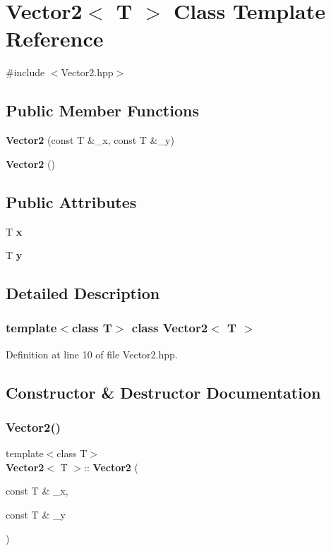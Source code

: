 \section{Vector2$<$ T $>$ Class Template Reference}
\label{class_vector2}


{\ttfamily \#include $<$Vector2.\+hpp$>$}

\subsection*{Public Member Functions}
\begin{DoxyCompactItemize}
\item 
\textbf{ Vector2} (const T \&\+\_\+x, const T \&\+\_\+y)
\item 
\textbf{ Vector2} ()
\end{DoxyCompactItemize}
\subsection*{Public Attributes}
\begin{DoxyCompactItemize}
\item 
T \textbf{ x}
\item 
T \textbf{ y}
\end{DoxyCompactItemize}


\subsection{Detailed Description}
\subsubsection*{template$<$class T$>$\newline
class Vector2$<$ T $>$}



Definition at line 10 of file Vector2.\+hpp.



\subsection{Constructor \& Destructor Documentation}
\mbox{\label{class_vector2_ab8cf9f67f03bae6dbc56de251fcbee28}} 
\subsubsection{Vector2()\hspace{0.1cm}{\footnotesize\ttfamily [1/2]}}
{\footnotesize\ttfamily template$<$class T$>$ \\
\textbf{ Vector2}$<$ T $>$\+::\textbf{ Vector2} (\begin{DoxyParamCaption}\item[{const T \&}]{\+\_\+x,  }\item[{const T \&}]{\+\_\+y }\end{DoxyParamCaption})\hspace{0.3cm}{\ttfamily [inline]}}



